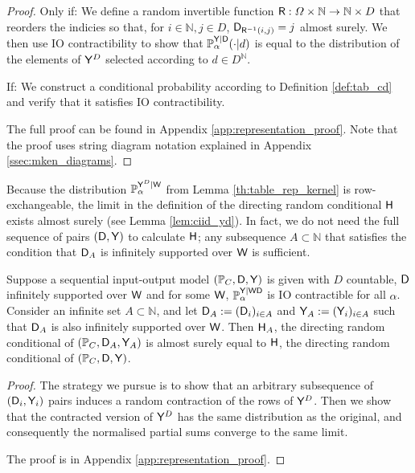 \begin{proof}
Only if: We define a random invertible function $\mathsf{R}:\Omega\times \mathbb{N}\to \mathbb{N}\times {D}$ that reorders the indicies so that, for $i\in \mathbb{N},j\in D$, $\mathsf{D}_{\mathsf{R}^{-1}(i,j)}=j$ almost surely. We then use IO contractibility to show that $\mathbb{P}_\alpha^{\mathsf{Y}|\mathsf{D}}(\cdot|d)$ is equal to the distribution of the elements of $\mathsf{Y}^D$ selected according to $d\in D^{\mathbb{N}}$.

If: We construct a conditional probability according to Definition \ref{def:tab_cd} and verify that it satisfies IO contractibility.

The full proof can be found in Appendix \ref{app:representation_proof}. Note that the proof uses string diagram notation explained in Appendix \ref{ssec:mken_diagrams}.
\end{proof}

Because the distribution $\mathbb{P}_\alpha^{\mathsf{Y}^D|\mathsf{W}}$ from Lemma \ref{th:table_rep_kernel} is row-exchangeable, the limit in the definition of the directing random conditional $\mathsf{H}$ exists almost surely (see Lemma \ref{lem:ciid_yd}).  In fact, we do not need the full sequence of pairs $(\mathsf{D},\mathsf{Y})$ to calculate $\mathsf{H}$; any subsequence $A\subset\mathbb{N}$ that satisfies the condition that $\mathsf{D}_A$ is infinitely supported over $\mathsf{W}$ is sufficient.

\begin{theorem}\label{th:any_infinite_sequence}
Suppose a sequential input-output model $(\mathbb{P}_C,\mathsf{D},\mathsf{Y})$ is given with $D$ countable,  $\mathsf{D}$ infinitely supported over $\mathsf{W}$ and for some $\mathsf{W}$, $\mathbb{P}_\alpha^{\mathsf{Y}|\mathsf{WD}}$ is IO contractible for all $\alpha$. Consider an infinite set $A\subset \mathbb{N}$, and let $\mathsf{D}_A:=(\mathsf{D}_i)_{i\in A}$ and $\mathsf{Y}_A:=(\mathsf{Y}_i)_{i\in A}$ such that $\mathsf{D}_A$ is also infinitely supported over $\mathsf{W}$. Then $\mathsf{H}_A$, the directing random conditional of $(\mathbb{P}_C,\mathsf{D}_A,\mathsf{Y}_A)$ is almost surely equal to $\mathsf{H}$, the directing random conditional of $(\mathbb{P}_C,\mathsf{D},\mathsf{Y})$.
\end{theorem}

\begin{proof}
The strategy we pursue is to show that an arbitrary subsequence of $(\mathsf{D}_i,\mathsf{Y}_i)$ pairs induces a random contraction of the rows of $\mathsf{Y}^D$. Then we show that the contracted version of $\mathsf{Y}^D$ has the same distribution as the original, and consequently the normalised partial sums converge to the same limit.

The proof is in Appendix \ref{app:representation_proof}.
\end{proof}

